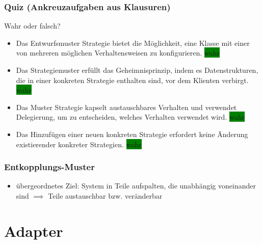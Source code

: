 \documentclass[18pt]{beamer}
\begin{document}
	\begin{frame}
		\frametitle{Quiz (Ankreuzaufgaben aus Klausuren)}
		Wahr oder falsch?
		\begin{itemize}
			\item Das Entwurfsmuster Strategie bietet die Möglichkeit, eine Klasse mit einer von mehreren möglichen Verhaltensweisen zu konfigurieren. \pause \colorbox{green}{wahr} \pause
			\item Das Strategiemuster erfüllt das Geheimnisprinzip, indem es Datenstrukturen, die in einer konkreten Strategie enthalten sind, vor dem Klienten verbirgt. \pause \colorbox{green}{wahr} \pause
			\item Das Muster Strategie kapselt austauschbares Verhalten und verwendet Delegierung, um zu entscheiden, welches Verhalten verwendet wird. \pause \colorbox{green}{wahr} \pause 
			\item Das Hinzufügen einer neuen konkreten Strategie erfordert keine Änderung existierender konkreter Strategien. \pause \colorbox{green}{wahr}
		\end{itemize}
	\end{frame}

	\begin{frame}
		\frametitle{Entkopplungs-Muster}
		\begin{itemize}
			\item übergeordnetes Ziel: System in Teile aufspalten, die unabhängig voneinander sind
			\linebreak $\implies$ Teile austauschbar bzw. veränderbar
	\end{itemize}
	\end{frame}

\section{Adapter}
\end{document}
